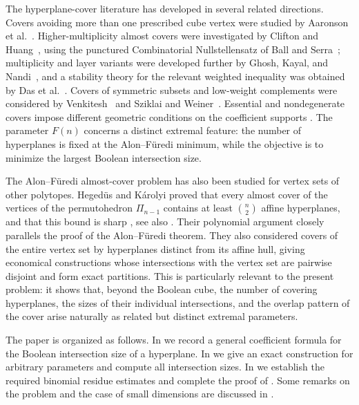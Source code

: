 \documentclass[11pt]{article}
\newcommand{\1}{\mathbf{1}}
\begin{document}
	The hyperplane-cover literature has developed in several related directions. Covers avoiding more than one prescribed cube vertex were studied by Aaronson et al.~\cite{AaronsonEtAl2021}. Higher-multiplicity almost covers were investigated by Clifton and Huang~\cite{CliftonHuang2020}, using the punctured Combinatorial Nullstellensatz of Ball and Serra~\cite{BallSerra2009}; multiplicity and layer variants were developed further by Ghosh, Kayal, and Nandi~\cite{GhoshKayalNandi2023}, and a stability theory for the relevant weighted inequality was obtained by Das et al.~\cite{DasEtAl2023}. Covers of symmetric subsets and low-weight complements were considered by Venkitesh~\cite{Venkitesh2022} and Sziklai and Weiner~\cite{SziklaiWeiner2023}. Essential and nondegenerate covers impose different geometric conditions on the coefficient supports \cite{LinialRadhakrishnan2005,SauermannXu2025,SauermannXu2026}. The parameter $F(n)$ concerns a distinct extremal feature: the number of hyperplanes is fixed at the Alon--F\"uredi minimum, while the objective is to minimize the largest Boolean intersection size.
	
	The Alon--Füredi almost-cover problem has also been studied for vertex sets of other polytopes. Hegedüs and Károlyi proved that every almost cover of the vertices of the permutohedron $\Pi_{n-1}$ contains at least $\binom{n}{2}$ affine hyperplanes, and that this bound is sharp \cite{HegedusKarolyi2024}, see also \cite{Karolyi2024}. Their polynomial argument closely parallels the proof of the Alon--Füredi theorem. They also considered covers of the entire vertex set by hyperplanes distinct from its affine hull, giving economical constructions whose intersections with the vertex set are pairwise disjoint and form exact partitions. This is particularly relevant to the present problem: it shows that, beyond the Boolean cube, the number of covering hyperplanes, the sizes of their individual intersections, and the overlap pattern of the cover arise naturally as related but distinct extremal parameters.
	
	
	The paper is organized as follows. In  we record a general coefficient formula for the Boolean intersection size of a hyperplane. In  we give an exact construction for arbitrary parameters and compute all intersection sizes. In  we establish the required binomial residue estimates and complete the proof of . Some remarks on the problem and the case of small dimensions are discussed in .
	
\end{document}
